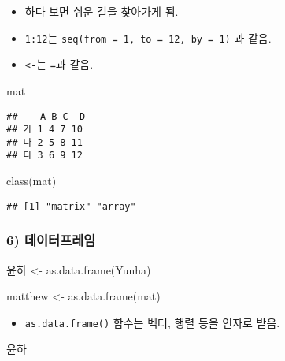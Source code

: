\documentclass[
  12,
]{article}
\newenvironment{Shaded}{\begin{snugshade}}{\end{snugshade}}
\newcommand{\FunctionTok}[1]{\textcolor[rgb]{0.00,0.00,0.00}{#1}}
\newcommand{\NormalTok}[1]{#1}
\newcommand{\OtherTok}[1]{\textcolor[rgb]{0.56,0.35,0.01}{#1}}
\providecommand{\tightlist}{%
  \setlength{\itemsep}{0pt}\setlength{\parskip}{0pt}}
\begin{document}
\begin{itemize}
\item
  하다 보면 쉬운 길을 찾아가게 됨.
\item
  \texttt{1:12}는 \texttt{seq(from\ =\ 1,\ to\ =\ 12,\ by\ =\ 1)} 과
  같음.
\item
  \texttt{\textless{}-}는 \texttt{=}과 같음.
\end{itemize}

\begin{Shaded}
\begin{Highlighting}[]
\NormalTok{mat}
\end{Highlighting}
\end{Shaded}

\begin{verbatim}
##    A B C  D
## 가 1 4 7 10
## 나 2 5 8 11
## 다 3 6 9 12
\end{verbatim}

\begin{Shaded}
\begin{Highlighting}[]
\FunctionTok{class}\NormalTok{(mat)}
\end{Highlighting}
\end{Shaded}

\begin{verbatim}
## [1] "matrix" "array"
\end{verbatim}

\hypertarget{uxb370uxc774uxd130uxd504uxb808uxc784}{%
\subsubsection{6)
데이터프레임}\label{uxb370uxc774uxd130uxd504uxb808uxc784}}

\begin{Shaded}
\begin{Highlighting}[]
\NormalTok{윤하 }\OtherTok{\textless{}{-}} \FunctionTok{as.data.frame}\NormalTok{(Yunha)}

\NormalTok{matthew }\OtherTok{\textless{}{-}} \FunctionTok{as.data.frame}\NormalTok{(mat)}
\end{Highlighting}
\end{Shaded}

\begin{itemize}
\tightlist
\item
  \texttt{as.data.frame()} 함수는 벡터, 행렬 등을 인자로 받음.
\end{itemize}

\begin{Shaded}
\begin{Highlighting}[]
\NormalTok{윤하}
\end{Highlighting}
\end{Shaded}
\end{document}

